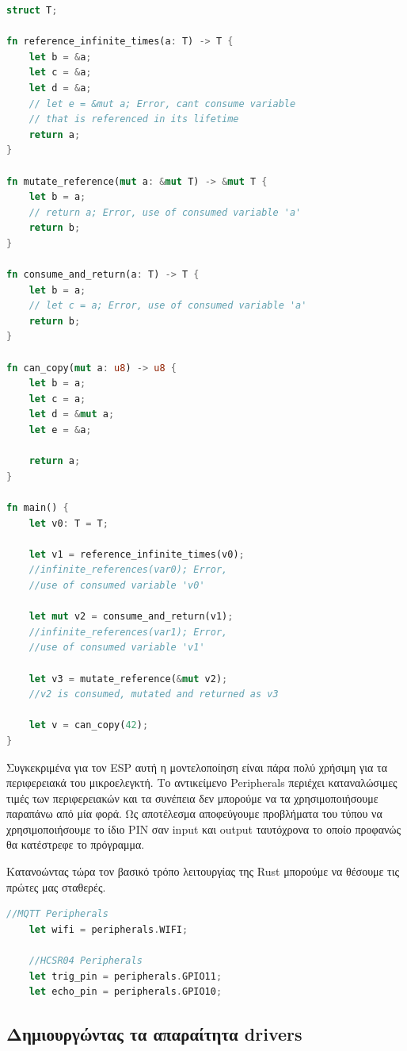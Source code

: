 \begin{lstlisting}[language=Rust]
struct T;

fn reference_infinite_times(a: T) -> T {
    let b = &a;
    let c = &a;
    let d = &a;
    // let e = &mut a; Error, cant consume variable
    // that is referenced in its lifetime
    return a;
}

fn mutate_reference(mut a: &mut T) -> &mut T {
    let b = a;
    // return a; Error, use of consumed variable 'a'
    return b;
}

fn consume_and_return(a: T) -> T {
    let b = a;
    // let c = a; Error, use of consumed variable 'a'
    return b;
}

fn can_copy(mut a: u8) -> u8 {
    let b = a;
    let c = a;
    let d = &mut a;
    let e = &a;

    return a;
}

fn main() {
    let v0: T = T;

    let v1 = reference_infinite_times(v0);
    //infinite_references(var0); Error,
    //use of consumed variable 'v0'

    let mut v2 = consume_and_return(v1);
    //infinite_references(var1); Error,
    //use of consumed variable 'v1'

    let v3 = mutate_reference(&mut v2);
    //v2 is consumed, mutated and returned as v3

    let v = can_copy(42);
}
\end{lstlisting}

Συγκεκριμένα για τον ESP αυτή η μοντελοποίηση είναι πάρα πολύ χρήσιμη για τα
περιφερειακά του μικροελεγκτή. Το αντικείμενο Peripherals περιέχει
καταναλώσιμες τιμές των περιφερειακών και τα συνέπεια δεν μπορούμε να
τα χρησιμοποιήσουμε παραπάνω από μία φορά. Ως αποτέλεσμα αποφεύγουμε
προβλήματα του τύπου να χρησιμοποιήσουμε το ίδιο PIN σαν input και
output ταυτόχρονα το οποίο προφανώς θα κατέστρεφε το πρόγραμμα.

Κατανοώντας τώρα τον βασικό τρόπο λειτουργίας της Rust
μπορούμε να θέσουμε τις πρώτες μας σταθερές.

\begin{lstlisting}[language=Rust]
    //MQTT Peripherals
    let wifi = peripherals.WIFI;

    //HCSR04 Peripherals
    let trig_pin = peripherals.GPIO11;
    let echo_pin = peripherals.GPIO10;
 \end{lstlisting}
 
 \subsection{Δημιουργώντας τα απαραίτητα drivers}

